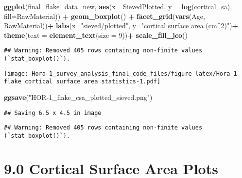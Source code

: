 \documentclass[
]{article}
\newenvironment{Shaded}{\begin{snugshade}}{\end{snugshade}}
\newcommand{\AttributeTok}[1]{\textcolor[rgb]{0.13,0.29,0.53}{#1}}
\newcommand{\DecValTok}[1]{\textcolor[rgb]{0.00,0.00,0.81}{#1}}
\newcommand{\FunctionTok}[1]{\textcolor[rgb]{0.13,0.29,0.53}{\textbf{#1}}}
\newcommand{\NormalTok}[1]{#1}
\newcommand{\SpecialCharTok}[1]{\textcolor[rgb]{0.81,0.36,0.00}{\textbf{#1}}}
\newcommand{\StringTok}[1]{\textcolor[rgb]{0.31,0.60,0.02}{#1}}
\begin{document}
\begin{Shaded}
\begin{Highlighting}[]
\FunctionTok{ggplot}\NormalTok{(final\_flake\_data\_new, }\FunctionTok{aes}\NormalTok{(}\AttributeTok{x=}\NormalTok{ SievedPlotted, }\AttributeTok{y =} \FunctionTok{log}\NormalTok{(cortical\_sa), }\AttributeTok{fill=}\NormalTok{RawMaterial)) }\SpecialCharTok{+}
  \FunctionTok{geom\_boxplot}\NormalTok{() }\SpecialCharTok{+}
  \FunctionTok{facet\_grid}\NormalTok{(}\FunctionTok{vars}\NormalTok{(Age, RawMaterial))}\SpecialCharTok{+}
  \FunctionTok{labs}\NormalTok{(}\AttributeTok{x=}\StringTok{"sieved/plotted"}\NormalTok{, }\AttributeTok{y=}\StringTok{"cortical surface area (cm\^{}2)"}\NormalTok{)}\SpecialCharTok{+}
  \FunctionTok{theme}\NormalTok{(}\AttributeTok{text =} \FunctionTok{element\_text}\NormalTok{(}\AttributeTok{size =} \DecValTok{9}\NormalTok{))}\SpecialCharTok{+}
  \FunctionTok{scale\_fill\_jco}\NormalTok{()}
\end{Highlighting}
\end{Shaded}

\begin{verbatim}
## Warning: Removed 405 rows containing non-finite values (`stat_boxplot()`).
\end{verbatim}

\texttt{[image: Hora-1\_survey\_analysis\_final\_code\_files/figure-latex/Hora-1 flake cortical surface area statistics-1.pdf]}

\begin{Shaded}
\begin{Highlighting}[]
\FunctionTok{ggsave}\NormalTok{(}\StringTok{"HOR{-}1\_flake\_csa\_plotted\_sieved.png"}\NormalTok{)}
\end{Highlighting}
\end{Shaded}

\begin{verbatim}
## Saving 6.5 x 4.5 in image
\end{verbatim}

\begin{verbatim}
## Warning: Removed 405 rows containing non-finite values (`stat_boxplot()`).
\end{verbatim}

\hypertarget{cortical-surface-area-plots}{%
\section{9.0 Cortical Surface Area
Plots}\label{cortical-surface-area-plots}}
\end{document}
